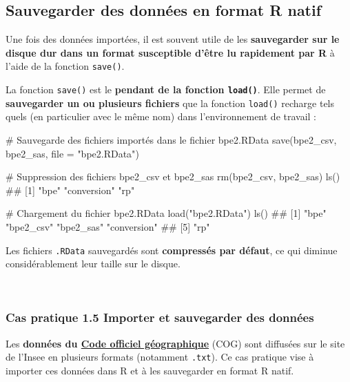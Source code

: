 \documentclass[12pt,twosided, notitlepage]{book}
\newenvironment{Shaded}{}{}
\newcommand{\KeywordTok}[1]{\textcolor[rgb]{0.00,0.00,1.00}{#1}}
\newcommand{\DataTypeTok}[1]{#1}
\newcommand{\StringTok}[1]{\textcolor[rgb]{0.00,0.50,0.50}{#1}}
\newcommand{\CommentTok}[1]{\textcolor[rgb]{0.00,0.50,0.00}{#1}}
\newcommand{\NormalTok}[1]{#1}
\renewenvironment{Shaded}{\begin{snugshade}}{\end{snugshade}}
\begin{document}
\subsection{Sauvegarder des données en format R
natif}\label{sauvegarder-des-donnees-en-format-r-natif}

Une fois des données importées, il est souvent utile de les
\textbf{sauvegarder sur le disque dur dans un format susceptible d'être
lu rapidement par R} à l'aide de la fonction
\texttt{save()}.

La fonction \texttt{save()} est le \textbf{pendant de la fonction
\texttt{load()}}. Elle permet de \textbf{sauvegarder un ou plusieurs
fichiers} que la fonction \texttt{load()} recharge
tels quels (en particulier avec le même nom) dans l'environnement de
travail :

\begin{Shaded}
\begin{Highlighting}[]
\CommentTok{# Sauvegarde des fichiers importés dans le fichier bpe2.RData}
\KeywordTok{save}\NormalTok{(bpe2_csv, bpe2_sas, }\DataTypeTok{file =} \StringTok{"bpe2.RData"}\NormalTok{)}

\CommentTok{# Suppression des fichiers bpe2_csv et bpe2_sas}
\KeywordTok{rm}\NormalTok{(bpe2_csv, bpe2_sas)}
\KeywordTok{ls}\NormalTok{()}
\NormalTok{  ## [1] "bpe"        "conversion" "rp"}

\CommentTok{# Chargement du fichier bpe2.RData}
\KeywordTok{load}\NormalTok{(}\StringTok{"bpe2.RData"}\NormalTok{)}
\KeywordTok{ls}\NormalTok{()}
\NormalTok{  ## [1] "bpe"        "bpe2_csv"   "bpe2_sas"   "conversion"}
\NormalTok{  ## [5] "rp"}
\end{Highlighting}
\end{Shaded}

Les fichiers \texttt{.RData} sauvegardés sont \textbf{compressés par
défaut}, ce qui diminue considérablement leur taille sur le disque.

~

\subsubsection{\texorpdfstring{\textbf{Cas pratique 1.5} Importer et
sauvegarder des
données}{Cas pratique 1.5 Importer et sauvegarder des données}}\label{cas-pratique-1.5-importer-et-sauvegarder-des-donnees}

Les \textbf{données du
\href{https://www.insee.fr/fr/information/2666684}{Code officiel
géographique}} (COG) sont diffusées sur le site de l'Insee en plusieurs
formats (notamment \texttt{.txt}). Ce cas pratique vise à importer ces
données dans R et à les sauvegarder en format R natif.
\end{document}
